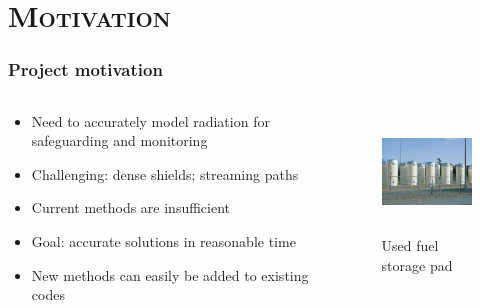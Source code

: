 \documentclass[handout]{beamer}
\renewcommand{\(}{\begin{columns}}
\renewcommand{\)}{\end{columns}}
\newcommand{\<}[1]{\begin{column}{#1}}
\renewcommand{\>}{\end{column}}
\begin{document}
\section{\scshape Motivation}
\begin{frame}[fragile]
  \frametitle{Project motivation}

\begin{columns}
  \begin{column}{0.55\textwidth}
	\begin{itemize}
	\item Need to accurately model radiation for safeguarding and monitoring
	\item \alert{Challenging}: dense shields; streaming paths
	\item Current methods are insufficient
	\item \alert{Goal}: accurate solutions in reasonable time
	\item New methods can easily be added to existing codes
	\end{itemize}
  \end{column}
  \begin{column}{0.45\textwidth}
  	\begin{figure}
  	\begin{center}
  		\includegraphics[height=1.25in,clip]{../figs/isfsi}
		\caption{Used fuel storage pad}
	\end{center}
  	\end{figure}
  \end{column}
\end{columns}

\end{frame}
\end{document}
